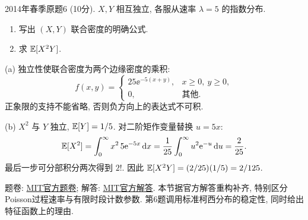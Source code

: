\begin{exercise}\label{m2:2014s:q6}
2014年春季原题6 (10分). $X,Y$ 相互独立, 各服从速率 $\lambda=5$ 的指数分布.
\begin{enumerate}
\item[(a)]\label{m2:2014s:q6:a} 写出 $(X,Y)$ 联合密度的明确公式.
\item[(b)]\label{m2:2014s:q6:b} 求 $\mathbb E[X^2Y]$.
\end{enumerate}
\end{exercise}
\begin{solution}
(a) 独立性使联合密度为两个边缘密度的乘积:
\[
f(x,y)=\begin{cases}25\ee^{-5(x+y)},&x\ge0,\ y\ge0,\\0,&\text{其他}.\end{cases}
\]
正象限的支持不能省略, 否则负方向上的表达式不可积.

(b) $X^2$ 与 $Y$ 独立, $\mathbb E[Y]=1/5$. 对二阶矩作变量替换 $u=5x$:
\[
\mathbb E[X^2]=\int_0^\infty x^2\,5\mathrm e^{-5x}\,\mathrm d x=\frac1{25}\int_0^\infty u^2\mathrm e^{-u}\,\mathrm d u=\frac2{25}.
\]
最后一步可分部积分两次得到 $2!$. 因此 $\mathbb E[X^2Y]=(2/25)(1/5)=2/125$.
\end{solution}

题卷: \href{https://ocw.mit.edu/courses/18-600-probability-and-random-variables-fall-2019/resources/mit18_600f19_mid2_2016/}{MIT官方题卷}; 解答: \href{https://ocw.mit.edu/courses/18-600-probability-and-random-variables-fall-2019/resources/mit18_600f19_mid2_2016_soln/}{MIT官方解答}. 本节据官方解答重构补齐, 特别区分Poisson过程速率与有限时段计数参数. 第6题调用标准柯西分布的稳定性, 同时给出特征函数上的理由.

